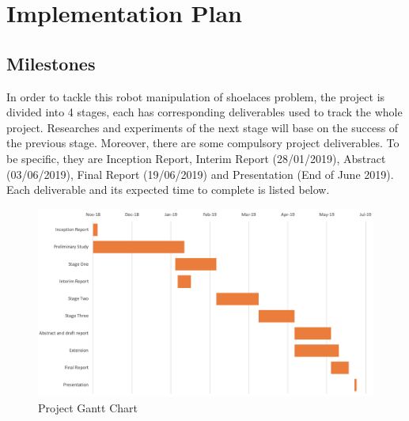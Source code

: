 \chapter{Implementation Plan}

\section{Milestones}
In order to tackle this robot manipulation of shoelaces problem, the project is divided into 4 stages, each has corresponding deliverables used to track the whole project. Researches and experiments of the next stage will base on the success of the previous stage. Moreover, there are some compulsory project deliverables. To be specific, they are Inception Report, Interim Report (28/01/2019), Abstract (03/06/2019), Final Report (19/06/2019) and Presentation (End of June 2019). Each deliverable and its expected time to complete is listed below.


\begin{figure}[h!]
    \centering
    \includegraphics[width = 1\columnwidth]{images/gantt_chart.png}
    \caption{Project Gantt Chart}
\end{figure}

